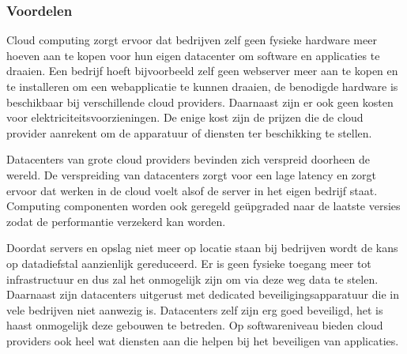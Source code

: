 \subsubsection{Voordelen}
\begin{description}[style=unboxed, labelwidth=\linewidth, listparindent =0pt]
    \item[Lagere kosten]
    Cloud computing zorgt ervoor dat bedrijven zelf geen fysieke hardware meer hoeven aan te kopen voor hun eigen datacenter om software en applicaties te draaien. Een bedrijf hoeft bijvoorbeeld zelf geen webserver meer aan te kopen en te installeren om een webapplicatie te kunnen draaien, de benodigde hardware is beschikbaar bij verschillende cloud providers. Daarnaast zijn er ook geen kosten voor elektriciteitsvoorzieningen. De enige kost zijn de prijzen die de cloud provider aanrekent om de apparatuur of diensten ter beschikking te stellen.
    \\

    \item[Performantie]
    Datacenters van grote cloud providers bevinden zich verspreid doorheen de wereld. De verspreiding van datacenters zorgt voor een lage latency en zorgt ervoor dat werken in de cloud voelt alsof de server in het eigen bedrijf staat. Computing componenten worden ook geregeld geüpgraded naar de laatste versies zodat de performantie verzekerd kan worden.
    \\

    \item [Veiligheid]
    Doordat servers en opslag niet meer op locatie staan bij bedrijven wordt de kans op datadiefstal aanzienlijk gereduceerd. Er is geen fysieke toegang meer tot infrastructuur en dus zal het onmogelijk zijn om via deze weg data te stelen. Daarnaast zijn datacenters uitgerust met dedicated beveiligingsapparatuur die in vele bedrijven niet aanwezig is. Datacenters zelf zijn erg goed beveiligd, het is haast onmogelijk deze gebouwen te betreden. Op softwareniveau bieden cloud providers ook heel wat diensten aan die helpen bij het beveiligen van applicaties.
    \\


\end{description}
